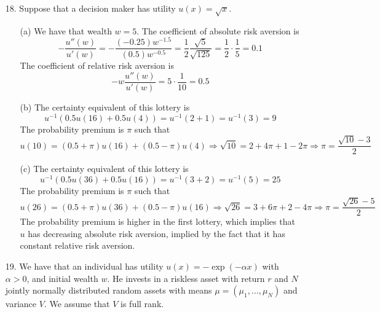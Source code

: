 \documentclass[12pt]{article}
\begin{document}
\begin{itemize}
\begin{proof}
		Next, assume that $u$ has CARA preferences. We know that $u$ has the form $u(x) = -\exp(-\gamma x)$, where $\gamma > 0$ is the coefficient of absolute risk aversion. Thus, 
		\[
		\expect[u(w_2)] = \expect\barl  u(w_1)\exp(-\gamma(((1-\alpha_{1})R + \alpha_{1}x_2))) \barr
		\]
		However, we cannot split the expectation here as above, since we do not know that the relevant moments for $x$ necessarily exist. Thus, the choice of $\alpha_1$ depends on $x_1$, so it will not necessarily hold that $\alpha_0 = \alpha_1$.
	\end{proof} 
	\item[18.] Suppose that a decision maker has utility $u(x) = \sqrt{x}$.
	\begin{itemize}
		\item[(a)] We have that wealth $w = 5$. The coefficient of absolute risk aversion is
		\[
		-\frac{u''(w)}{u'(w)} = -\frac{(-0.25)w^{-1.5}}{(0.5)w^{-0.5}} = \frac{1}{2} \frac{\sqrt{5}}{\sqrt{125}} = \frac{1}{2	}\cdot \frac{1}{5} = 0.1
		\]
		The coefficient of relative risk aversion is
		\[
		-w \frac{u''(w)}{u'(w)} = 5 \cdot \frac{1}{10} = 0.5
		\]
		\item[(b)] The certainty equivalent of this lottery is
		\[
		u^{-1}(0.5 u(16) + 0.5u(4)) = u^{-1}(2 + 1) = u^{-1}(3) = 9
		\]
		The probability premium is $\pi$ such that
		\[
		u(10) = (0.5 + \pi)u(16) + (0.5 - \pi)u(4) \Longrightarrow \sqrt{10} = 2 + 4\pi + 1 - 2\pi \Longrightarrow \pi = \frac{\sqrt{10}-3}{2}
		\]
		\item[(c)] The certainty equivalent of this lottery is
		\[
		u^{-1}(0.5 u(36) + 0.5u(16)) = u^{-1}(3 + 2) = u^{-1}(5) = 25
		\]
		The probability premium is $\pi$ such that
		\[
		u(26) = (0.5 + \pi)u(36) + (0.5 - \pi)u(16) \Rightarrow \sqrt{26} = 3 + 6\pi + 2 - 4\pi \Rightarrow \pi = \frac{\sqrt{26}-5}{2}
		\]
		The probability premium is higher in the first lottery, which implies that $u$ has decreasing absolute risk aversion, implied by the fact that it has constant relative risk aversion.
	\end{itemize}
	\item[19.] We have that an individual has utility $u(x) = -\exp(-\alpha x)$ with $\alpha > 0$, and initial wealth $w$. He invests in a riskless asset with return $r$ and $N$ jointly normally distributed random assets with means $\mu = (\mu_1,\dots,\mu_N)$ and variance $V$. We assume that $V$ is full rank.
	

\end{itemize}
\end{document}
